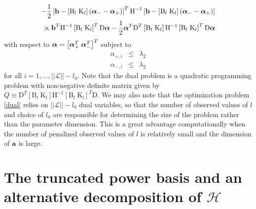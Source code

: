 \documentclass[12pt]{article}
\newcommand{\bfalpha}{\mbox{\boldmath $\alpha$}}
\newcommand{\bfa}{\mbox{\bf a}}
\newcommand{\bfb}{\mbox{\bf b}}
\newcommand{\matK}{\mbox{K}}
\newcommand{\matH}{\mbox{H}}
\newcommand{\matB}{\mbox{B}}
\newcommand{\matD}{\mbox{D}}
\begin{document}
\begin{eqnarray}
  -\frac{1}{2}\left[ \bfb - \left[\matB_l\;\matK_l\right]\left(\bfalpha_- -\bfalpha_+  \right) \right]^T\matH^{-1} \left[ \bfb - \left[\matB_l\;\matK_l\right]\left(\bfalpha_- -\bfalpha_+  \right) \right] \\
  \propto  \bfb^T\matH^{-1}\left[\matB_l\;\matK_l \right]^T\matD \bfalpha - \frac{1}{2}\bfalpha^T\matD^T \left[\matB_l\;\matK_l \right] \matH^{-1}\left[\matB_l\;\matK_l \right]^T\matD\bfalpha \label{dual}
\end{eqnarray} \noindent
with respect to $\bfalpha = \left[ \bfalpha_+^T\;\bfalpha_-^T \right]^T$ subject to
\begin{eqnarray}
\alpha_{+,i} &\le& \lambda_2\\
\alpha_{-,i} &\le& \lambda_2
\end{eqnarray}
\noindent
for all $i = 1,\dots, \vert \vert \mathcal{L}\vert \vert - l_0$. Note that the dual problem is a quadratic programming problem with non-negative definite matrix given by $Q \equiv \matD^T \left[\matB_l\;\matK_l \right] \matH^{-1}\left[\matB_l\;\matK_l \right]^T\matD$. We may also note that the optimization problem \eqref{dual} relies on $\vert \vert \mathcal{L}\vert \vert - l_0$ dual variables, so that the number of observed values of $l$ and choice of $l_0$ are responsible for determining the size of the problem rather than the parameter dimension. This is a great advantage computationally when the number of penalized observed values of $l$ is relatively small and the dimension of $\bfa$ is large. 

\section{The truncated power basis and an alternative decomposition of $\mathcal{H}$}
\end{document}
